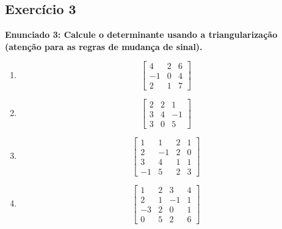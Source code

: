\documentclass{article}
\begin{document}
\subsection*{Exerc\'icio 3}
\textbf{Enunciado 3: Calcule o determinante usando a triangulariza\c{c}\~ao (aten\c{c}\~ao para as regras de mudan\c{c}a de sinal).}
\begin{enumerate}
    \item 
    \[
    \begin{bmatrix}
        4 & 2  & 6 \\
        -1 & 0 & 4 \\
        2 & 1 & 7
    \end{bmatrix}
    \]
    \item
    \[
    \begin{bmatrix}
        2 & 2 & 1 \\
        3 & 4 & -1 \\
        3 & 0 & 5
    \end{bmatrix}
    \]
    \item 
    \[
    \begin{bmatrix}
        1 & 1 & 2 & 1 \\
        2 & -1 & 2 & 0 \\
        3 & 4 & 1 & 1 \\
        -1 & 5 & 2 & 3
    \end{bmatrix}
    \]
    \item 
    \[
    \begin{bmatrix}
        1 & 2 & 3 & 4 \\
        2 & 1 & -1 & 1 \\
        -3 & 2 & 0 & 1 \\
        0 & 5 & 2 & 6
    \end{bmatrix}
    \]
\end{enumerate}

\end{document}
